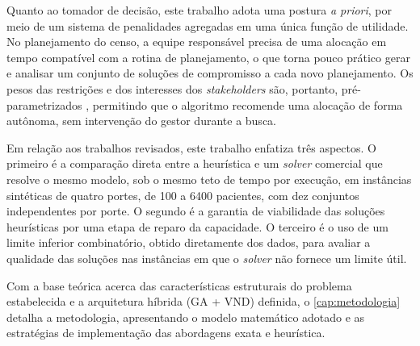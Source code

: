 Quanto ao tomador de decisão, este trabalho adota uma postura \textit{a priori}, por meio de um sistema de penalidades agregadas em uma única função de utilidade. No planejamento do censo, a equipe responsável precisa de uma alocação em tempo compatível com a rotina de planejamento, o que torna pouco prático gerar e analisar um conjunto de soluções de compromisso a cada novo planejamento. Os pesos das restrições e dos interesses dos \textit{stakeholders} são, portanto, pré-parametrizados \cite{schafer2023combining}, permitindo que o algoritmo recomende uma alocação de forma autônoma, sem intervenção do gestor durante a busca.

Em relação aos trabalhos revisados, este trabalho enfatiza três aspectos. O primeiro é a comparação direta entre a heurística e um \textit{solver} comercial que resolve o mesmo modelo, sob o mesmo teto de tempo por execução, em instâncias sintéticas de quatro portes, de 100 a 6400 pacientes, com dez conjuntos independentes por porte. O segundo é a garantia de viabilidade das soluções heurísticas por uma etapa de reparo da capacidade. O terceiro é o uso de um limite inferior combinatório, obtido diretamente dos dados, para avaliar a qualidade das soluções nas instâncias em que o \textit{solver} não fornece um limite útil.

Com a base teórica acerca das características estruturais do problema estabelecida e a arquitetura híbrida (GA + VND) definida, o \autoref{cap:metodologia} detalha a metodologia, apresentando o modelo matemático adotado e as estratégias de implementação das abordagens exata e heurística.
